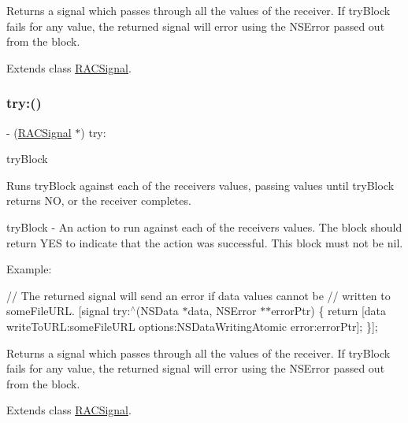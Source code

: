 Returns a signal which passes through all the values of the receiver. If {\ttfamily try\+Block} fails for any value, the returned signal will error using the {\ttfamily N\+S\+Error} passed out from the block. 

Extends class \mbox{\hyperlink{interface_r_a_c_signal_ac65d7a1a19db9cb2f78c03781995bbe9}{R\+A\+C\+Signal}}.

\mbox{\label{category_r_a_c_signal_07_operations_08_ac65d7a1a19db9cb2f78c03781995bbe9}} 
\subsubsection{\texorpdfstring{try\+:()}{try:()}\hspace{0.1cm}{\footnotesize\ttfamily [3/3]}}
{\footnotesize\ttfamily -\/ (\mbox{\hyperlink{interface_r_a_c_signal}{R\+A\+C\+Signal}} $\ast$) try\+: \begin{DoxyParamCaption}\item[{(B\+O\+OL($^\wedge$)(id value, N\+S\+Error $\ast$$\ast$error\+Ptr))}]{try\+Block }\end{DoxyParamCaption}}

Runs {\ttfamily try\+Block} against each of the receiver\textquotesingle{}s values, passing values until {\ttfamily try\+Block} returns NO, or the receiver completes.

try\+Block -\/ An action to run against each of the receiver\textquotesingle{}s values. The block should return Y\+ES to indicate that the action was successful. This block must not be nil.

Example\+:

// The returned signal will send an error if data values cannot be // written to {\ttfamily some\+File\+U\+RL}. \mbox{[}signal try\+:$^\wedge$(N\+S\+Data $\ast$data, N\+S\+Error $\ast$$\ast$error\+Ptr) \{ return \mbox{[}data write\+To\+U\+RL\+:some\+File\+U\+RL options\+:N\+S\+Data\+Writing\+Atomic error\+:error\+Ptr\mbox{]}; \}\mbox{]};

Returns a signal which passes through all the values of the receiver. If {\ttfamily try\+Block} fails for any value, the returned signal will error using the {\ttfamily N\+S\+Error} passed out from the block. 

Extends class \mbox{\hyperlink{interface_r_a_c_signal_ac65d7a1a19db9cb2f78c03781995bbe9}{R\+A\+C\+Signal}}.

